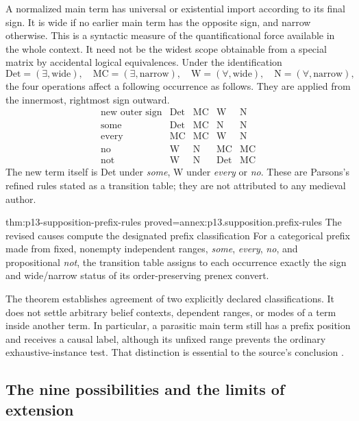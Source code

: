 A normalized main term has universal or existential import according
to its final sign. It is wide if no earlier main term has the opposite
sign, and narrow otherwise. This is a syntactic measure of the
quantificational force available in the whole context. It need not be
the widest scope obtainable from a special matrix by accidental logical
equivalences. Under the identification
\[
\mathrm{Det}=(\exists,\text{wide}),\quad
\mathrm{MC}=(\exists,\text{narrow}),\quad
\mathrm W=(\forall,\text{wide}),\quad
\mathrm N=(\forall,\text{narrow}),
\]
the four operations affect a following occurrence as follows. They
are applied from the innermost, rightmost sign outward.
\[
\begin{array}{c|cccc}
\text{new outer sign}&\mathrm{Det}&\mathrm{MC}&\mathrm W&\mathrm N\\\hline
\text{some}&\mathrm{Det}&\mathrm{MC}&\mathrm N&\mathrm N\\
\text{every}&\mathrm{MC}&\mathrm{MC}&\mathrm W&\mathrm N\\
\text{no}&\mathrm W&\mathrm N&\mathrm{MC}&\mathrm{MC}\\
\text{not}&\mathrm W&\mathrm N&\mathrm{Det}&\mathrm{MC}
\end{array}
\]
The new term itself is Det under \emph{some}, W under \emph{every}
or \emph{no}. These are Parsons's refined rules stated as a transition
table; they are not attributed to any medieval author.

\begin{hbtheorem}{thm:p13-supposition-prefix-rules}
 {proved=annex:p13.supposition.prefix-rules}
 {The revised causes compute the designated prefix classification}
For a categorical prefix made from fixed, nonempty independent ranges,
\emph{some}, \emph{every}, \emph{no}, and propositional \emph{not},
the transition table assigns to each occurrence exactly the sign and
wide/narrow status of its order-preserving prenex convert.
\end{hbtheorem}

The theorem establishes agreement of two explicitly declared
classifications. It does not settle arbitrary belief contexts, dependent
ranges, or modes of a term inside another term. In particular, a parasitic
main term still has a prefix position and receives a causal label,
although its unfixed range prevents the ordinary exhaustive-instance
test. That distinction is essential to the source's conclusion
\cite[pp.~272--273]{Parsons2007FordhamSupposition}.

\subsection{The nine possibilities and the limits of extension}
\label{sec:p13-supposition-other-modes}

